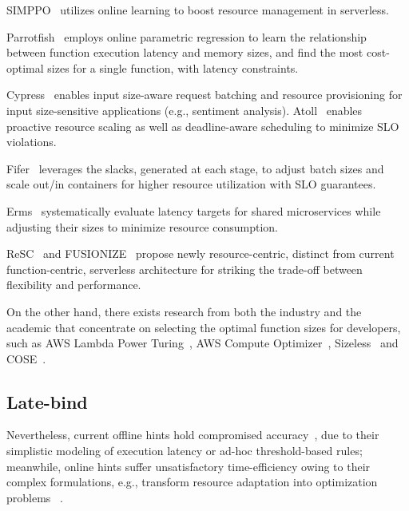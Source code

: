 SIMPPO~\cite{socc22-simppo} utilizes online learning to boost resource management in serverless.

Parrotfish~\cite{socc23-parrotfish} employs online parametric regression to learn the relationship between function execution latency and memory sizes, and find the most cost-optimal sizes for a single function, with latency constraints.




Cypress~\cite{socc22-cypress} enables input size-aware request batching and resource provisioning for input size-sensitive applications (e.g., sentiment analysis). 
Atoll~\cite{socc21-atoll} enables proactive resource scaling as well as deadline-aware scheduling to minimize SLO violations.

Fifer~\cite{middleware20-fifer} leverages the slacks, generated at each stage, to adjust batch sizes and scale out/in containers for higher resource utilization with SLO guarantees.

Erms~\cite{asplos23-erms} systematically evaluate latency targets for shared microservices while adjusting their sizes to minimize resource consumption.

ReSC~\cite{arxiv22-resc} and FUSIONIZE~\cite{ic2e22-fusionize} propose newly resource-centric, distinct from current function-centric, serverless architecture for striking the trade-off between flexibility and performance.





On the other hand, there exists research from both the industry and the academic that concentrate on selecting the optimal function sizes for developers, such as AWS Lambda Power Turing~\cite{lambda-tuning}, AWS Compute Optimizer~\cite{lambda-compute-optimizer}, Sizeless~\cite{middleware21-sizeless} and COSE~\cite{infocom20-cose}.



\subsection{Late-bind}

Nevertheless, current offline hints hold compromised accuracy~\cite{middleware21-sizeless,infocom20-cose,socc23-parrotfish,socc22-cypress}, due to their simplistic modeling of execution latency or ad-hoc threshold-based rules; meanwhile, online hints suffer unsatisfactory time-efficiency owing to their complex formulations, e.g., transform resource adaptation into optimization problems ~\cite{rtas22-fa2,infocom22-stepconf,icdcs23-joint-video-analyze}.

